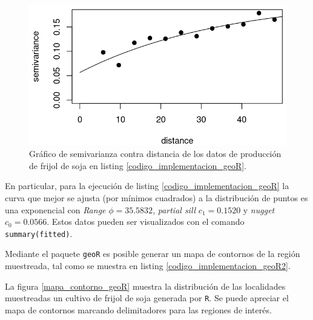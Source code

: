 \documentclass[14pt]{extarticle}
\begin{document}
\begin{figure}[h]
	\centering
	\includegraphics[scale=0.8]{proyecto_kriging/Rplot_variograma_ejemplo1.png}\caption{Gráfico de semivarianza contra distancia de los datos de producción de frijol de soja en listing \ref{codigo_implementacion_geoR}.}\label{variograma_geoR}
\end{figure}

En particular, para la ejecución de listing \ref{codigo_implementacion_geoR} la curva que mejor se ajusta (por mínimos cuadrados) a la distribución de puntos es una exponencial con \textit{Range} $\phi = 35.5832$, \textit{partial sill} $c_1 = 0.1520$ y \textit{nugget} $c_0 = 0.0566$. Estos datos pueden ser visualizados con el comando \verb|summary(fitted)|. 

Mediante el paquete \verb|geoR| es posible generar un mapa de contornos de la región muestreada, tal como se muestra en listing \ref{codigo_implementacion_geoR2}. 



La figura \ref{mapa_contorno_geoR} muestra la distribución de las localidades muestreadas un cultivo de frijol de soja generada por \verb|R|. Se puede apreciar el mapa de contornos marcando delimitadores para las regiones de interés. 
\end{document}
